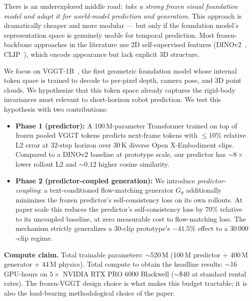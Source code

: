\documentclass[10pt,letterpaper]{article}
\begin{document}
There is an underexplored middle road: \emph{take a strong frozen visual foundation model and adapt it for world-model prediction and generation}. This approach is dramatically cheaper and more modular --- but only if the foundation model's representation space is genuinely usable for temporal prediction. Most frozen-backbone approaches in the literature use 2D self-supervised features (DINOv2~\citep{dinov2_2023}, CLIP~\citep{clip_2021}), which encode appearance but lack explicit 3D structure.

We focus on VGGT-1B~\citep{vggt_2024}, the first geometric foundation model whose internal token space is trained to decode to per-pixel depth, camera pose, and 3D point clouds. We hypothesize that this token space already captures the rigid-body invariances most relevant to short-horizon robot prediction. We test this hypothesis with two contributions:

\begin{itemize}[leftmargin=*,itemsep=2pt]
\item \textbf{Phase 1 (predictor):} A 100\,M-parameter Transformer trained on top of frozen pooled VGGT tokens predicts next-frame tokens with $\leq 10\%$ relative L2 error at 32-step horizon over 30\,K diverse Open X-Embodiment clips. Compared to a DINOv2 baseline at prototype scale, our predictor has $\sim 8\times$ lower rollout L2 and $\sim 0.12$ higher cosine similarity.

\item \textbf{Phase 2 (predictor-coupled generation):} We introduce \emph{predictor-coupling}: a text-conditioned flow-matching generator $G_\theta$ additionally minimizes the frozen predictor's self-consistency loss on its own rollouts. At paper scale this reduces the predictor's self-consistency loss by 70\% relative to its uncoupled baseline, at zero measurable cost to flow-matching loss. The mechanism strictly generalizes a 30-clip prototype's $-41.5\%$ effect to a $30\,000$-clip regime.
\end{itemize}

\noindent\textbf{Compute claim.} Total trainable parameters: $\sim$520\,M (100\,M predictor + 400\,M generator + 44\,M physics). Total compute to obtain the headline results: $\sim$16 GPU-hours on $5\times$ NVIDIA RTX PRO 6000 Blackwell ($\sim$\$40 at standard rental rates). The frozen-VGGT design choice is what makes this budget tractable; it is also the load-bearing methodological choice of the paper.

\end{document}
